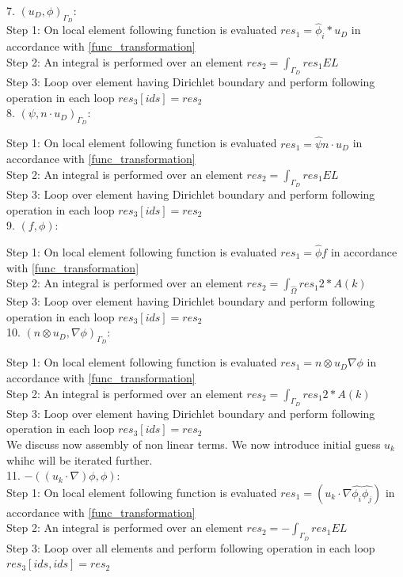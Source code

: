 \documentclass[a4paper,12pt]{book}
\begin{document}
7. $(u_D,\phi)_{\Gamma_D}$:
\\

Step 1: On local element following function is evaluated $res_1=\hat{\phi}_i*u_D$ in accordance with \ref{func_transformation}\\
Step 2: An integral is performed over an element $res_2=\int_{\Gamma_D} res_1 EL $\\
Step 3: Loop over element having Dirichlet boundary and perform following operation in each loop $res_3[ids]=res_2$\\

8. $(\psi, n \cdot u_D)_{\Gamma_D} $:

Step 1: On local element following function is evaluated $res_1=\hat{\psi} n\cdot u_D$ in accordance with \ref{func_transformation}\\
Step 2: An integral is performed over an element $res_2=\int_{\Gamma_D} res_1 EL $\\
Step 3: Loop over element having Dirichlet boundary and perform following operation in each loop $res_3[ids]=res_2$\\

9. $(f,\phi) $:

Step 1: On local element following function is evaluated $res_1= \hat{\phi} f$ in accordance with \ref{func_transformation}\\
Step 2: An integral is performed over an element $res_2=\int_{\hat{\Omega}} res_1 2*A(k)$\\
Step 3: Loop over element having Dirichlet boundary and perform following operation in each loop $res_3[ids]=res_2$\\


10. $(n \otimes u_D,\nabla \phi)_{\Gamma_D} $:

Step 1: On local element following function is evaluated $res_1= n \otimes u_D  \nabla \phi$ in accordance with \ref{func_transformation}\\
Step 2: An integral is performed over an element $res_2=\int_{\Gamma_D} res_1 2*A(k)$\\
Step 3: Loop over element having Dirichlet boundary and perform following operation in each loop $res_3[ids]=res_2$\\

We discuss now assembly of non linear terms. We now introduce initial guess $u_k$ whihc will be iterated further.\\

11. $-((u_k \cdot \nabla)\phi , \phi)$:\\
Step 1: On local element following function is evaluated $res_1 = (u_k \cdot \nabla \hat{\phi_i} \hat{\phi_j}) $ in accordance with \ref{func_transformation}\\
Step 2: An integral is performed over an element $res_2= - \int_{\Gamma_D} res_1 EL$\\
Step 3: Loop over all elements and perform following operation in each loop $res_3[ids,ids]=res_2$\\
\end{document}
